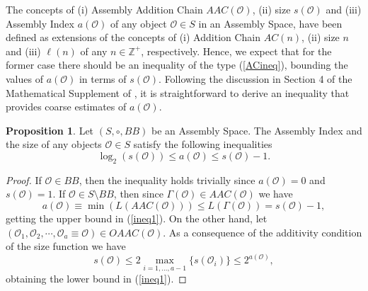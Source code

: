 \documentclass[letterpaper,12pt]{article}
\theoremstyle{definition}
\newtheorem{proposition}{Proposition}
\begin{document}
The concepts of (i) Assembly Addition Chain $AAC(\mathscr{O})$, (ii) size $s(\mathscr{O})$ and (iii) Assembly Index $a(\mathscr{O})$ of any object $\mathscr{O} \in S$ in an Assembly Space, have been defined as extensions of the concepts of (i) Addition Chain $AC(n)$, (ii) size $n$ and (iii) $\ell(n)$ of any $n \in \mathbb{Z}^+$, respectively. Hence, we expect that for the former case there should be an inequality of the type (\ref{ACineq}), bounding the values of $a(\mathscr{O})$ in terms of $s(\mathscr{O})$. Following the discussion in Section 4 of the Mathematical Supplement of \cite{Sharma2023AssemblyTE}, it is straightforward to derive an inequality that provides coarse estimates of $a(\mathscr{O})$.


\begin{proposition}\label{prop1} Let $(S,\circ,BB)$ be an Assembly Space. The Assembly Index and the size of any objects $\mathscr{O} \in S$ satisfy the following inequalities
    \begin{equation}\label{ineq1}
        \log_2(s(\mathscr{O})) \leq a(\mathscr{O}) \leq s(\mathscr{O})-1.
    \end{equation}
\end{proposition}

\begin{proof} If $\mathscr{O} \in BB$, then the inequality holds trivially since $a(\mathscr{O})=0$ and $s(\mathscr{O})=1$. If $\mathscr{O} \in S \setminus BB$, then since $\Gamma( \mathscr{O}) \in AAC(\mathscr{O})$
we have 
\begin{equation*}
  a(\mathscr{O}) \equiv \min (L(AAC(\mathscr{O})))  \leq L(\Gamma(\mathscr{O})) = s(\mathscr{O})-1,  
\end{equation*}
getting the upper bound in (\ref{ineq1}). On the other hand, let $(\mathscr{O}_1,\mathscr{O}_2,\cdots,\mathscr{O}_a\equiv \mathscr{O}) \in    O   AAC(\mathscr{O})$. As a consequence of the additivity condition of the size function we have 
\begin{equation*}
    s(\mathscr{O}) \leq 2 \max_{i=1,...,a-1}\{ s(\mathscr{O}_i) \} \leq 2^{a(\mathscr{O})},
\end{equation*}
obtaining the lower bound in (\ref{ineq1}).
\end{proof}
\end{document}
